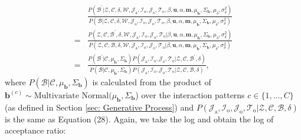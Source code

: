 \documentclass[a4paper]{article}
\begin{document}
   \begin{equation}
   \begin{aligned}
   & \frac{P(\mathcal{B}^\prime|\mathcal{Z},   \mathcal{C},  \delta, \mathcal{W}, \mathcal{J}_{\mbox{a}}, \mathcal{I}_{\mbox{o}}, \mathcal{J}_{\mbox{o}}, \mathcal{T}_{\mbox{o}}, \beta, \boldsymbol{u}, \alpha, \boldsymbol{m}, \mu_{\boldsymbol{b}}, \Sigma_{\boldsymbol{b}}, \mu_\delta, \sigma^2_\delta)}{P(\mathcal{B}|\mathcal{Z},   \mathcal{C}, \delta, \mathcal{W}, \mathcal{J}_{\mbox{a}},\mathcal{I}_{\mbox{o}}, \mathcal{J}_{\mbox{o}}, \mathcal{T}_{\mbox{o}}, \beta, \boldsymbol{u}, \alpha, \boldsymbol{m}, \mu_{\boldsymbol{b}}, \Sigma_{\boldsymbol{b}}, \mu_\delta, \sigma^2_\delta)}\\=&\frac{P(\mathcal{Z}, \mathcal{C}, \mathcal{B}^\prime, \delta, \mathcal{W},  \mathcal{J}_{\mbox{a}}, \mathcal{I}_{\mbox{o}}, \mathcal{J}_{\mbox{o}}, \mathcal{T}_{\mbox{o}} |\beta, \boldsymbol{u}, \alpha, \boldsymbol{m}, \mu_{\boldsymbol{b}}, \Sigma_{\boldsymbol{b}}, \mu_\delta, \sigma^2_\delta)}{P(\mathcal{Z}, \mathcal{C}, \mathcal{B}, \delta, \mathcal{W}, \mathcal{J}_{\mbox{a}}, \mathcal{I}_{\mbox{o}}, \mathcal{J}_{\mbox{o}}, \mathcal{T}_{\mbox{o}} |\beta, \boldsymbol{u}, \alpha, \boldsymbol{m}, \mu_{\boldsymbol{b}}, \Sigma_{\boldsymbol{b}}, \mu_\delta, \sigma^2_\delta)}\\=&\frac{P(\mathcal{B}^\prime|\mathcal{C}, \mu_{\boldsymbol{b}}, \Sigma_{\boldsymbol{b}})P(\mathcal{J}_{\mbox{a}}, \mathcal{I}_{\mbox{o}}, \mathcal{J}_{\mbox{o}}, \mathcal{T}_{\mbox{o}} |\mathcal{Z}, \mathcal{C}, \mathcal{B}^\prime, \delta)}{P(\mathcal{B}|\mathcal{C}, \mu_{\boldsymbol{b}}, \Sigma_{\boldsymbol{b}})P(\mathcal{J}_{\mbox{a}}, \mathcal{I}_{\mbox{o}}, \mathcal{J}_{\mbox{o}}, \mathcal{T}_{\mbox{o}} |\mathcal{Z}, \mathcal{C}, \mathcal{B}, \delta)},
   \end{aligned}
   \end{equation}
   where $P(\mathcal{B}|\mathcal{C}, \mu_{\boldsymbol{b}}, \Sigma_{\boldsymbol{b}})$ is calculated from the product of $\boldsymbol{b}^{(c)}\sim \mbox{Multivariate Normal}(\mu_{\boldsymbol{b}}, \Sigma_{\boldsymbol{b}}$) over the interaction patterns $c \in \{1,...,C\}$ (as defined in Section \ref{sec: Generative Process}) and $P(\mathcal{J}_{\mbox{a}}, \mathcal{I}_{\mbox{o}}, \mathcal{J}_{\mbox{o}}, \mathcal{T}_{\mbox{o}} |\mathcal{Z}, \mathcal{C}, \mathcal{B}, \delta)$ is the same as Equation (28). Again, we take the log and obtain the log of acceptance ratio:
\end{document}
